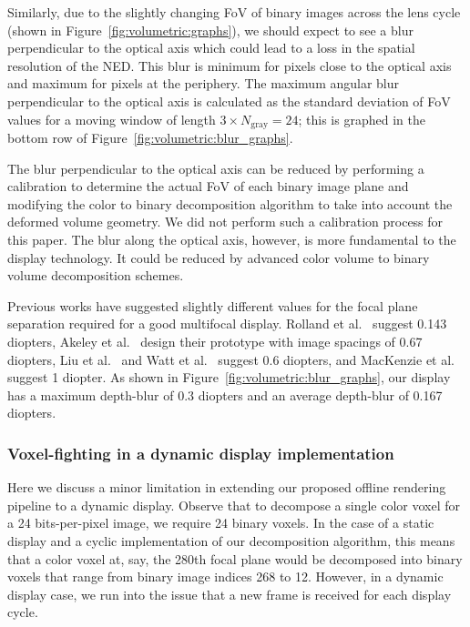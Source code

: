 Similarly, due to the slightly changing FoV of binary images across the lens cycle (shown in Figure~\ref{fig:volumetric:graphs}), we should expect to see a blur perpendicular to the optical axis which could lead to a loss in the spatial resolution of the NED. This blur is minimum for pixels close to the optical axis and maximum for pixels at the periphery. The maximum angular blur perpendicular to the optical axis is calculated as the standard deviation of FoV values for a moving window of length $3 \times N_{\text{gray}}=24$; this is graphed in the bottom row of Figure~\ref{fig:volumetric:blur_graphs}.

The blur perpendicular to the optical axis can be reduced by performing a calibration to determine the actual FoV of each binary image plane and modifying the color to binary decomposition algorithm to take into account the deformed volume geometry. We did not perform such a calibration process for this paper. The blur along the optical axis, however, is more fundamental to the display technology. It could be reduced by advanced color volume to binary volume decomposition schemes. 

Previous works have suggested slightly different values for the focal plane separation required for a good multifocal display. Rolland et al.~\cite{Rolland1999dynamic} suggest 0.143 diopters, Akeley et al.~\cite{Akeley2004stereo} design their prototype with image spacings of 0.67 diopters, Liu et al.~\cite{Liu2010systematic} and Watt et al.~\cite{Watt2012Real} suggest 0.6 diopters, and MacKenzie et al.~\cite{MacKenzie2010Accommodation} suggest 1 diopter. As shown in Figure~\ref{fig:volumetric:blur_graphs}, our display has a maximum depth-blur of 0.3 diopters and an average depth-blur of 0.167 diopters. 



\subsubsection{Voxel-fighting in a dynamic display implementation}
Here we discuss a minor limitation in extending our proposed offline rendering pipeline to a dynamic display. Observe that to decompose a single color voxel for a 24 bits-per-pixel image, we require 24 binary voxels. In the case of a static display and a cyclic implementation of our decomposition algorithm, this means that a color voxel at, say, the 280th focal plane would be decomposed into binary voxels that range from binary image indices 268 to 12. However, in a dynamic display case, we run into the issue that a new frame is received for each display cycle. 

